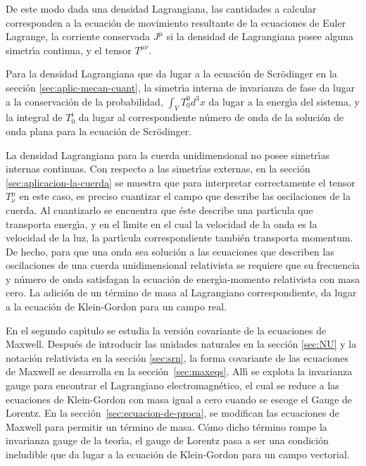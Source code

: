 De este modo dada una densidad Lagrangiana, las cantidades a calcular corresponden a la ecuaci\'on de movimiento resultante de la ecuaciones de Euler Lagrange, la corriente conservada $J^\mu$ si la densidad de Lagrangiana posee alguna simetr\'\i a continua, y el tensor $T^{\mu\nu}$. 

Para la densidad Lagrangiana que da lugar a la ecuaci\'on de Scr\"odinger en la secci\'on \ref{sec:aplic-mecan-cuant}, la simetr\'\i a interna de invarianza de fase da lugar a la conservaci\'on de la probabilidad, $\int_V T^0_0 d^3x$ da lugar a la energ\'\i a del sistema, y la integral de $T^i_0$ da lugar al correspondiente n\'umero de onda de la soluci\'on de onda plana para la ecuaci\'on de Scr\"odinger.

La densidad Lagrangiana para la cuerda unidimensional no posee simetr\'\i as internas continuas. Con respecto a las simetr\'\i as externas, en la secci\'on \ref{sec:aplicacion-la-cuerda} se muestra que para interpretar correctamente el tensor $T^\mu_\nu$ en este caso, es preciso cuantizar el campo que describe las oscilaciones de la cuerda. Al cuantizarlo se encuentra que \'este describe una part\'\i cula que transporta energ\'\i a, y en el l\'\i mite en el cual la velocidad de la onda es la velocidad de la luz, la part\'\i cula correspondiente tambi\'en transporta momentum. De hecho, para que una onda sea soluci\'on a las ecuaciones que describen las oscilaciones de una cuerda unidimensional relativista se requiere que su frecuencia y n\'umero de onda satisfagan la ecuaci\'on de energ\'\i a-momento relativista con masa cero. La adici\'on de un t\'ermino de masa al Lagrangiano correspondiente, da lugar a la ecuaci\'on de Klein-Gordon para un campo real. 

En el segundo cap\'\i tulo se estudia la versi\'on covariante de la ecuaciones de Maxwell. Despu\'es de introducir las unidades naturales en la secci\'on \ref{sec:NU} y la notaci\'on relativista en la secci\'on \ref{sec:srn}, la forma covariante de las ecuaciones de Maxwell se desarrolla en la secci\'on~\ref{sec:maxeqs}. All\'\i{} se explota la invarianza gauge para encontrar el Lagrangiano electromagn\'etico, el cual se reduce a las ecuaciones de Klein-Gordon con masa igual a cero cuando se escoge el Gauge de Lorentz. En la secci\'on~\ref{sec:ecuacion-de-proca}, se modifican las ecuaciones de Maxwell para permitir un t\'ermino de masa. C\'omo dicho t\'ermino rompe la invarianza gauge de la teor\'\i a, el gauge de Lorentz pasa a ser una condici\'on ineludible que da lugar a la ecuaci\'on de Klein-Gordon para un campo vectorial.

